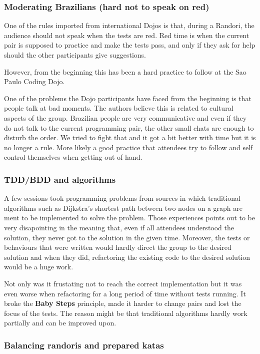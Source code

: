 \subsubsection{Moderating Brazilians (hard not to speak on red)}

One of the rules imported from international Dojos is that, during a
Randori, the audience should not speak when the tests are red. Red
time is when the current pair is supposed to practice and make the
tests pass, and only if they ask for help should the other
participants give suggestions.

However, from the beginning this has been a hard practice to follow at
the Sao Paulo Coding Dojo.

One of the problems the Dojo participants have faced from the
beginning is that people talk at bad moments. The authors believe this
is related to cultural aspects of the group. Brazilian people are very
communicative and even if they do not talk to the current programming
pair, the other small chats are enough to disturb the order. We tried
to fight that and it got a bit better with time but it is no longer a
rule. More likely a good practice that attendees try to follow and
self control themselves when getting out of hand.

\subsubsection{TDD/BDD and algorithms}

A few sessions took programming problems from sources in which
traditional algorithms such as Dijkstra's shortest path between two
nodes on a graph are ment to be implemented to solve the
problem. Those experiences points out to be very disapointing in the
meaning that, even if all attendees understood the solution, they
never got to the solution in the given time. Moreover, the tests or
behaviours that were written would hardly direct the group to the
desired solution and when they did, refactoring the existing code to
the desired solution would be a huge work.

Not only was it frustating not to reach the correct implementation but
it was even worse when refactoring for a long period of time without
tests running. It broke the \textbf{Baby Steps} principle, made it
harder to change pairs and lost the focus of the tests. The reason
might be that traditional algorithms hardly work partially and can be
improved upon.

\subsubsection{Balancing randoris and prepared katas}

